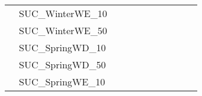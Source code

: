 \begin{table}[]
{\begin{tabular}{|c|l|ll|ll|ll|l|l|l|}
			& SUC\_WinterWE\_10             &                                   &                                  &                           &                          &                           &                          &                                       &                               & \\
			& SUC\_WinterWE\_50             &                                   &                                  &                           &                          &                           &                          &                                       &                               & \\
			& SUC\_SpringWD\_10             &                                   &                                  &                           &                          &                           &                          &                                       &                               & \\
			& SUC\_SpringWD\_50             &                                   &                                  &                           &                          &                           &                          &                                       &                               & \\
			& SUC\_SpringWE\_10             &                                   &                                  &                           &                          &                           &                          &                                       &                               & \\

\end{tabular}}
\end{table}
